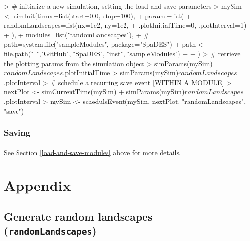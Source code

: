 \documentclass{article}
\begin{document}
\begin{Schunk}
\begin{Sinput}
> # initialize a new simulation, setting the load and save parameters
> mySim <- simInit(times=list(start=0.0, stop=100),
+                  params=list(
+                    randomLandscapes=list(nx=1e2, ny=1e2,
+                                 .plotInitialTime=0, .plotInterval=1)
+                    ),
+                  modules=list("randomLandscapes"),
+                  # path=system.file("sampleModules", package="SpaDES")
+                  path <- file.path("~","GitHub", "SpaDES", "inst", "sampleModules")
+ 
+ )
> # retrieve the plotting params from the simulation object
> simParams(mySim)$randomLandscapes$.plotInitialTime
> simParams(mySim)$randomLandscapes$.plotInterval
> # schedule a recurring save event [WITHIN A MODULE]
> nextPlot <- simCurrentTime(mySim) + simParams(mySim)$randomLandscapes$.plotInterval
> mySim <- scheduleEvent(mySim, nextPlot, "randomLandscapes", "save")
\end{Sinput}
\end{Schunk}

\subsubsection{Saving}

\paragraph{}
See Section \ref{load-and-save-modules} above for more details.

\newpage
\appendix
\renewcommand{\thesection}{}
\section{Appendix}
\renewcommand{\thesubsection}{\Alph{subsection}}

\subsection{Generate random landscapes (\texttt{randomLandscapes})}
\end{document}
